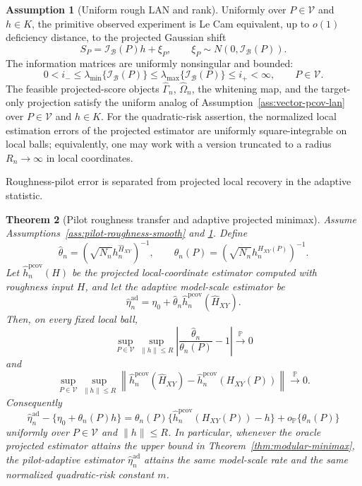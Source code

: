 \documentclass[11pt,a4paper]{amsart}
\theoremstyle{plain}
\newtheorem{theorem}{Theorem}[section]
\theoremstyle{definition}
\newtheorem{assumption}[theorem]{Assumption}
\theoremstyle{remark}
\newcommand{\PP}{\mathbb{P}}
\newcommand{\toP}{\xrightarrow{\PP}}
\newcommand{\scrB}{\mathcal{B}}
\newcommand{\scrI}{\mathcal{I}}
\begin{document}
\begin{assumption}[Uniform rough LAN and rank]\label{ass:uniform-rough-lan-rank}
Uniformly over \(P\in\mathcal V\) and \(h\in K\), the primitive observed experiment is Le Cam
equivalent, up to \(o(1)\) deficiency distance, to the projected Gaussian shift
\[
        S_P=\scrI_{\scrB}(P)h+\xi_P,
        \qquad
        \xi_P\sim N(0,\scrI_{\scrB}(P)).
\]
The information matrices are uniformly nonsingular and bounded:
\[
        0<i_-\le
        \lambda_{\min}\{\scrI_{\scrB}(P)\}
        \le
        \lambda_{\max}\{\scrI_{\scrB}(P)\}
        \le i_+<\infty,
        \qquad P\in\mathcal V.
\]
The feasible projected-score objects \(\widehat\Gamma_n\), \(\widehat\Omega_n\), the whitening map,
and the target-only projection satisfy the uniform analog of
Assumption~\ref{ass:vector-pcov-lan} over \(P\in\mathcal V\) and \(h\in K\).  For the
quadratic-risk assertion, the normalized local estimation errors of the projected estimator are
uniformly square-integrable on local balls; equivalently, one may work with a version
truncated to a radius \(R_n\to\infty\) in local coordinates.
\end{assumption}

Roughness-pilot error is separated from projected local recovery in the adaptive statistic.

\begin{theorem}[Pilot roughness transfer and adaptive projected minimax]\label{thm:pilot-roughness-transfer}
Assume Assumptions~\ref{ass:pilot-roughness-smooth} and
\ref{ass:uniform-rough-lan-rank}.  Define
\[
        \widehat\theta_n
        =
        (\sqrt{N_n}h_n^{\widehat H_{XY}})^{-1},
        \qquad
        \theta_n(P)
        =
        (\sqrt{N_n}h_n^{H_{XY}(P)})^{-1}.
\]
Let \(\widehat h_n^{\mathrm{pcov}}(H)\) be the projected local-coordinate estimator computed with
roughness input \(H\), and let the adaptive model-scale estimator be
\[
        \widehat\eta_n^{\mathrm{ad}}
        =
        \eta_0+\widehat\theta_n\widehat h_n^{\mathrm{pcov}}(\widehat H_{XY}) .
\]
Then, on every fixed local ball,
\[
        \sup_{P\in\mathcal V}
        \sup_{\|h\|\le R}
        \left|
        \frac{\widehat\theta_n}{\theta_n(P)}-1
        \right|
        \toP 0
\]
and
\[
        \sup_{P\in\mathcal V}
        \sup_{\|h\|\le R}
        \left\|
        \widehat h_n^{\mathrm{pcov}}(\widehat H_{XY})
        -
        \widehat h_n^{\mathrm{pcov}}(H_{XY}(P))
        \right\|
        \toP 0 .
\]
Consequently
\[
        \widehat\eta_n^{\mathrm{ad}}
        -
        \{\eta_0+\theta_n(P)h\}
        =
        \theta_n(P)
        \{\widehat h_n^{\mathrm{pcov}}(H_{XY}(P))-h\}
        +
        o_{\PP}\{\theta_n(P)\}
\]
uniformly over \(P\in\mathcal V\) and \(\|h\|\le R\).  In particular, whenever the oracle projected
estimator attains the upper bound in Theorem~\ref{thm:modular-minimax}, the pilot-adaptive estimator
\(\widehat\eta_n^{\mathrm{ad}}\) attains the same model-scale rate and the same normalized
quadratic-risk constant \(m\).
\end{theorem}
\end{document}

